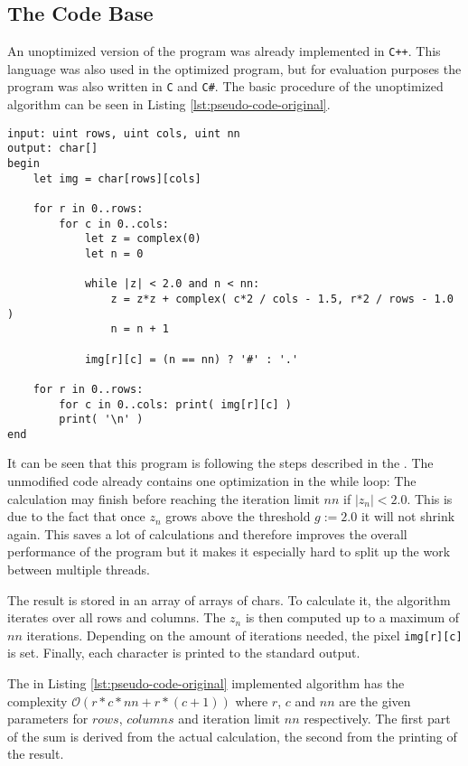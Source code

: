 \subsection{The Code Base}
\label{ssec:code-base}

An unoptimized version of the program was already implemented in \verb|C++|. This language was also used in the optimized program, but for evaluation purposes the program was also written in \verb|C| and \verb|C#|. The basic procedure of the unoptimized algorithm can be seen in Listing \ref{lst:pseudo-code-original}.

\begin{lstlisting}[caption={Pseudo code of the unoptimized algorithm}, label={lst:pseudo-code-original}, captionpos=b, frame=tb]
input: uint rows, uint cols, uint nn
output: char[]
begin
    let img = char[rows][cols]
    
    for r in 0..rows:
        for c in 0..cols:
            let z = complex(0)
            let n = 0
            
            while |z| < 2.0 and n < nn:
                z = z*z + complex( c*2 / cols - 1.5, r*2 / rows - 1.0 )
                n = n + 1
                
            img[r][c] = (n == nn) ? '#' : '.'
    
    for r in 0..rows:
        for c in 0..cols: print( img[r][c] )
        print( '\n' )
end
\end{lstlisting}

\noindent It can be seen that this program is following the steps described in the . The unmodified code already contains one optimization in the while loop: The calculation may finish before reaching the iteration limit $nn$ if $|z_n| < 2.0$. This is due to the fact that once $z_n$ grows above the threshold $g := 2.0$ it will not shrink again. This saves a lot of calculations and therefore improves the overall performance of the program but it makes it especially hard to split up the work between multiple threads.

The result is stored in an array of arrays of chars. To calculate it, the algorithm iterates over all rows and columns. The $z_n$ is then computed up to a maximum of $nn$ iterations. Depending on the amount of iterations needed, the pixel \verb|img[r][c]| is set. Finally, each character is printed to the standard output.

The in Listing \ref{lst:pseudo-code-original} implemented algorithm has the complexity $\mathcal{O}(r*c*nn+r*(c+1))$ where $r$, $c$ and $nn$ are the given parameters for $rows$, $columns$ and iteration limit $nn$ respectively. The first part of the sum is derived from the actual calculation, the second from the printing of the result.


